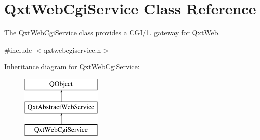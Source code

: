 \hypertarget{class_qxt_web_cgi_service}{\section{Qxt\-Web\-Cgi\-Service Class Reference}
\label{class_qxt_web_cgi_service}
}


The \hyperlink{class_qxt_web_cgi_service}{Qxt\-Web\-Cgi\-Service} class provides a C\-G\-I/1. gateway for Qxt\-Web.  




{\ttfamily \#include $<$qxtwebcgiservice.\-h$>$}

Inheritance diagram for Qxt\-Web\-Cgi\-Service\-:\begin{figure}[H]
\begin{center}
\leavevmode
\includegraphics[height=3.000000cm]{class_qxt_web_cgi_service}
\end{center}
\end{figure}
